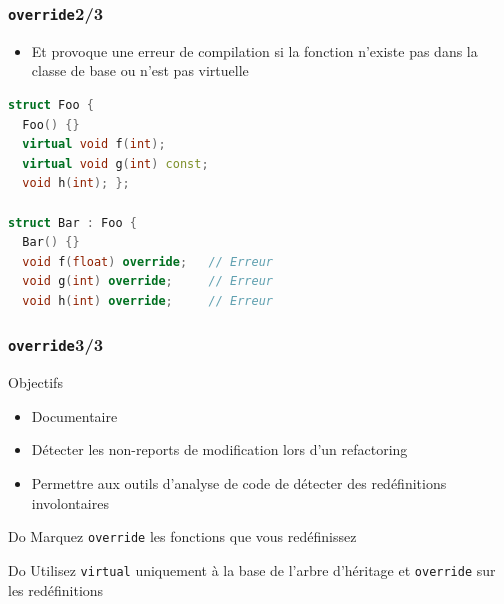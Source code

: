 \documentclass[C++.tex]{subfiles}
\begin{document}
\begin{frame}[fragile]
	\frametitle{\lstinline|override|\titlehfill{}2/3}
	\begin{itemize}
		\item Et provoque une erreur de compilation si la fonction n'existe pas dans la classe de base ou n'est pas virtuelle

	\end{itemize}

	\begin{lstlisting}[language=C++]
struct Foo {
  Foo() {}
  virtual void f(int); 
  virtual void g(int) const;
  void h(int); };

struct Bar : Foo {
  Bar() {}
  void f(float) override;   // Erreur 
  void g(int) override;     // Erreur
  void h(int) override;     // Erreur\end{lstlisting}
\end{frame}

\begin{frame}[fragile]
	\frametitle{\lstinline|override|\titlehfill{}3/3}
	\begin{block}{Objectifs}
		\begin{itemize}
			\item Documentaire
			\item Détecter les non-reports de modification lors d'un refactoring
			\item Permettre aux outils d'analyse de code de détecter des redéfinitions involontaires
		\end{itemize}
	\end{block}

	\begin{exampleblock}{Do}
		Marquez \lstinline|override| les fonctions que vous redéfinissez
	\end{exampleblock}

	\begin{exampleblock}{Do}
		Utilisez \lstinline|virtual| uniquement à la base de l'arbre d'héritage et \lstinline|override| sur les redéfinitions

	\end{exampleblock}
\end{frame}
\end{document}
